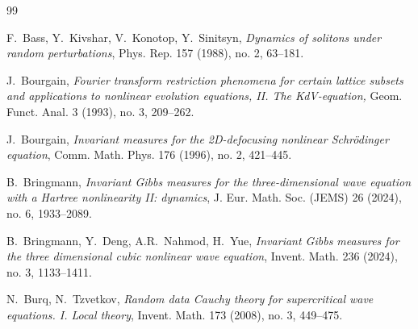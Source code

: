 \documentclass[letterpaper, 11pt,  reqno]{amsart}
\newcommand{\1}{\hspace{0.5mm}\textup{I}\hspace{0.5mm}}
\newcommand{\noi}{\noindent}
\numberwithin{equation}{section}
\numberwithin{theorem}{section}
\begin{document}
%
%
%
%








\begin{thebibliography}{99}



F.~Bass, Y.~Kivshar, V.~Konotop, Y.~Sinitsyn, 
{\it Dynamics of solitons under random perturbations}, Phys.
Rep. 157 (1988), no. 2, 63--181.

J.~Bourgain, 
{\it Fourier transform restriction phenomena for certain lattice subsets and applications to nonlinear evolution equations, II. The KdV-equation,} 
 Geom. Funct. Anal. 3 (1993), no. 3, 209--262.




J.~Bourgain,
{\it Invariant measures for the 2D-defocusing nonlinear Schr\"odinger equation},
Comm. Math. Phys. 176 (1996), no. 2, 421--445.

%

%
%
%



B.~Bringmann, 
{\it Invariant Gibbs measures for the three-dimensional wave equation with a Hartree nonlinearity II: dynamics},
 J. Eur. Math. Soc. (JEMS) 26 (2024), no. 6, 1933--2089. 







B.~Bringmann, Y.~Deng, A.R.~Nahmod, H.~Yue, 
{\it Invariant Gibbs measures for the three dimensional cubic nonlinear wave equation},
 Invent. Math. 236 (2024), no. 3, 1133--1411. 

%
%




N.~Burq, N.~Tzvetkov, 
{\it Random data Cauchy theory for supercritical wave equations. I. Local theory},
 Invent. Math. 173 (2008), no. 3, 449--475. 








\end{thebibliography}
\end{document}
